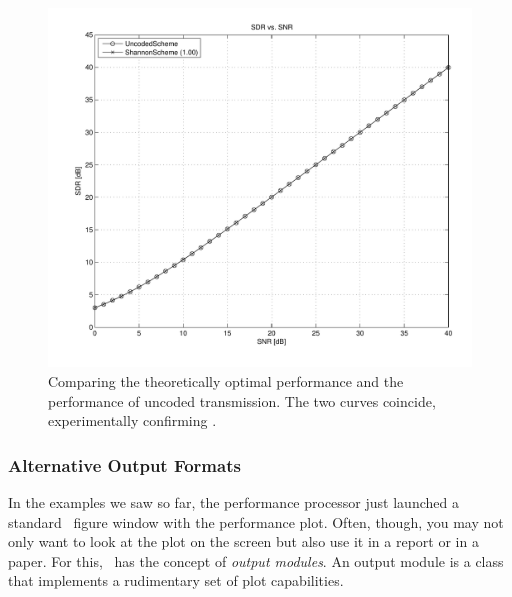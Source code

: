 \begin{figure}
  \begin{center}
    \includegraphics[width=\textwidth]{figures/matlab/ex_shannonscheme.pdf}
  \end{center}
  \caption{Comparing the theoretically optimal performance and the performance
  of uncoded transmission. The two curves coincide, experimentally confirming
  .}
  \label{fig:shannonscheme}
\end{figure}


\subsubsection{Alternative Output Formats}

In the examples we saw so far, the performance processor just launched a
standard \matlab\ figure window with the performance plot. Often, though, you
may not only want to look at the plot on the screen but also use it in a report
or in a paper. For this, \jscsim\ has the concept of \emph{output modules}. An
output module is a class that implements a rudimentary set of plot capabilities.

